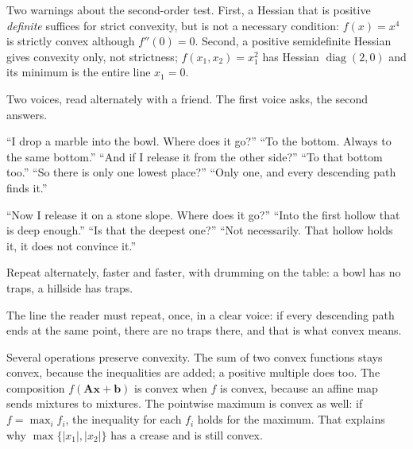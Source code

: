 Two warnings about the second-order test. First, a Hessian that is positive
\emph{definite} suffices for strict convexity, but is not a necessary condition:
$f(x)=x^{4}$ is strictly convex although $f''(0)=0$. Second, a positive semidefinite Hessian
gives convexity only, not strictness; $f(x_{1},x_{2})=x_{1}^{2}$ has Hessian
$\operatorname{diag}(2,0)$ and its minimum is the entire line $x_{1}=0$.

\begin{bacakeras}
Two voices, read alternately with a friend. The first voice asks, the second answers.

``I drop a marble into the bowl. Where does it go?'' ``To the bottom. Always to the same
bottom.'' ``And if I release it from the other side?'' ``To that bottom too.'' ``So there is
only one lowest place?'' ``Only one, and every descending path finds it.''

``Now I release it on a stone slope. Where does it go?'' ``Into the first hollow that is deep
enough.'' ``Is that the deepest one?'' ``Not necessarily. That hollow holds it, it does not
convince it.''

Repeat alternately, faster and faster, with drumming on the table: a bowl has no traps, a
hillside has traps.

The line the reader must repeat, once, in a clear voice: if every descending path ends at the
same point, there are no traps there, and that is what convex means.
\end{bacakeras}

Several operations preserve convexity. The sum of two convex functions stays convex, because
the inequalities are added; a positive multiple does too. The composition
$f(\mathbf{A}\mathbf{x}+\mathbf{b})$ is convex when $f$ is convex, because an affine map
sends mixtures to mixtures. The pointwise maximum is convex as well: if $f=\max_{i}f_{i}$,
the inequality for each $f_{i}$ holds for the maximum. That explains why
$\max\{|x_{1}|,|x_{2}|\}$ has a crease and is still convex.

